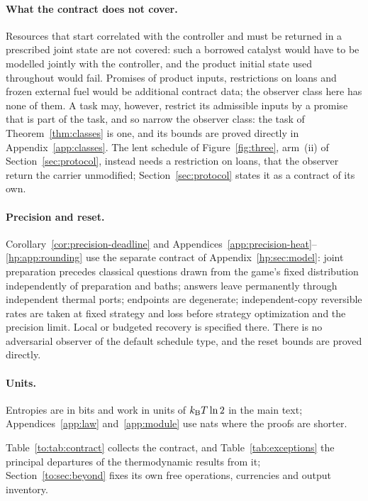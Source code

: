 \paragraph{What the contract does not cover.} Resources that start correlated with the controller and must be returned in a prescribed joint state are not covered: such a borrowed catalyst would have to be modelled jointly with the controller, and the product initial state used throughout would fail. Promises of product inputs, restrictions on loans and frozen external fuel would be additional contract data; the observer class here has none of them. A task may, however, restrict its admissible inputs by a promise that is part of the task, and so narrow the observer class: the task of Theorem~\ref{thm:classes} is one, and its bounds are proved directly in Appendix~\ref{app:classes}. The lent schedule of Figure~\ref{fig:three}, arm~(ii) of Section~\ref{sec:protocol}, instead needs a restriction on loans, that the observer return the carrier unmodified; Section~\ref{sec:protocol} states it as a contract of its own.

\paragraph{Precision and reset.} Corollary~\ref{cor:precision-deadline} and Appendices~\ref{app:precision-heat}--\ref{hp:app:rounding} use the separate contract of Appendix~\ref{hp:sec:model}: joint preparation precedes classical questions drawn from the game's fixed distribution independently of preparation and baths; answers leave permanently through independent thermal ports; endpoints are degenerate; independent-copy reversible rates are taken at fixed strategy and loss before strategy optimization and the precision limit. Local or budgeted recovery is specified there. There is no adversarial observer of the default schedule type, and the reset bounds are proved directly.

\paragraph{Units.} Entropies are in bits and work in units of $k_{\mathrm B} T\ln2$ in the main text; Appendices~\ref{app:law} and~\ref{app:module} use nats where the proofs are shorter.

Table~\ref{to:tab:contract} collects the contract, and Table~\ref{tab:exceptions} the principal departures of the thermodynamic results from it; Section~\ref{to:sec:beyond} fixes its own free operations, currencies and output inventory.
